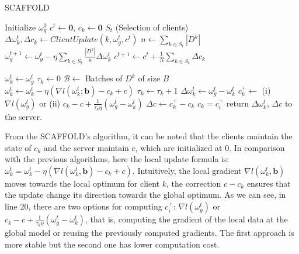 \begin{algorithm}[H]
  \label{alg:SCAFFOLD}
  \caption{SCAFFOLD}
  \begin{algorithmic}[1]
    \Statex
    \State Initialize $\omega_g^0$
    \State $c^t \gets \mathbf{0}$, $c_k \gets \mathbf{0}$
      \State $S_t$  (Selection of clients)
        \State $\Delta \omega_k^{t}, \Delta c_k \gets ClientUpdate(k, \omega_g^t, c^t)$
      \EndFor
      \State $n \gets \sum_{k \in S_t} |D^k|$
      \State $\omega_g^{t+1} \gets \omega_g^t - \eta \sum_{k \in S_t} \frac{|D^k|}{n} \Delta \omega_k^t$
      \State $c^{t+1} \gets c^t + \frac{1}{N} \sum_{k \in S_t} \Delta c_k$
    \EndFor
    \EndProcedure

    \State $\omega_k^t \gets \omega_g^t$
    \State $\tau_k \gets 0$
    \State $\mathcal{B} \gets$ Batches of $D^k$ of size $B$
        \State $\omega_k^t \gets \omega_k^t - \eta (\nabla l(\omega_k^t; \mathbf{b}) - c_k + c)$
        \State $\tau_k \gets \tau_k + 1$
      \EndFor
    \EndFor
    \State $\Delta \omega_k^t \gets \omega_g^t - \omega_k^t$
    \State $c_k^+ \gets $ (i) $\nabla l(\omega_g^t)$ or (ii) $c_k - c + \frac{1}{\tau_k \eta} (\omega_g^t - \omega_k^t)$
    \State $\Delta c \gets c_k^+ - c_k$
    \State $c_k = c_i^+$
    \State return $\Delta \omega_k^t$, $\Delta c$  to the server.
    \EndProcedure
  \end{algorithmic}
\end{algorithm}

From the SCAFFOLD's algorithm, it can be noted that the clients maintain the state of $c_k$ and the server maintain $c$, which are initialized at 0.
In comparison with the previous algorithms, here the local update formula is: $\omega_k^t = \omega_k^t - \eta (\nabla l (\omega_k^t, \mathbf{b}) - c_k + c)$. Intuitively, the local gradient $\nabla l (\omega_k^t, \mathbf{b})$ moves towards the local optimum for client $k$, the correction $c - c_k$ ensures that the update change its direction towards the global optimum.
As we can see, in line 20, there are two options for computing $c_i^+$: $\nabla l(\omega_g^t)$ or $c_k - c + \frac{1}{\tau_k \eta} (\omega_g^t - \omega_k^t)$, that is, computing the gradient of the local data at the global model or reusing the previously computed gradients. The first approach is more stable but the second one has lower computation cost.\\


